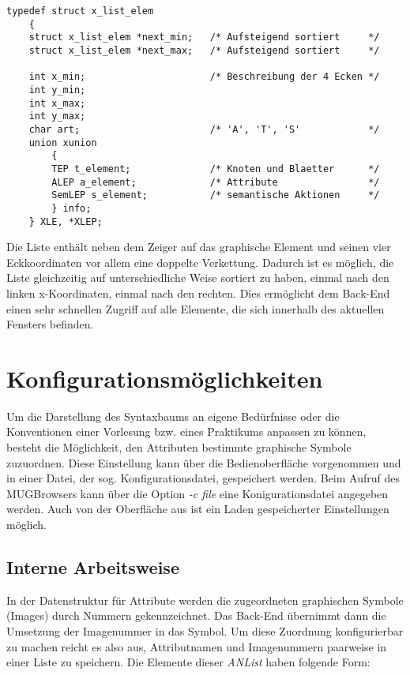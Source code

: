 \begin{small}
\begin{verbatim}
typedef struct x_list_elem
    {
    struct x_list_elem *next_min;   /* Aufsteigend sortiert     */
    struct x_list_elem *next_max;   /* Aufsteigend sortiert     */

    int x_min;                      /* Beschreibung der 4 Ecken */
    int y_min;
    int x_max;
    int y_max;
    char art;                       /* 'A', 'T', 'S'            */
    union xunion
        {
        TEP t_element;              /* Knoten und Blaetter      */
        ALEP a_element;             /* Attribute                */
        SemLEP s_element;           /* semantische Aktionen     */
        } info;
    } XLE, *XLEP;
\end{verbatim}
\end{small}

Die Liste enth\"alt neben dem Zeiger auf das graphische Element und seinen vier Eckkoordinaten vor allem eine doppelte Verkettung. Dadurch ist es
m\"oglich, die Liste gleichzeitig auf unterschiedliche Weise sortiert zu haben, einmal nach den linken x-Koordinaten, einmal nach den rechten. Dies
erm\"oglicht dem Back-End einen sehr schnellen Zugriff auf alle Elemente, die sich innerhalb des aktuellen Fensters befinden.

\section{Konfigurationsm\"oglichkeiten}

Um die Darstellung des Syntaxbaums an eigene Bed\"urfnisse oder die Konventionen einer Vorlesung bzw. eines Praktikums anpassen zu k\"onnen, besteht die
M\"oglichkeit, den Attributen bestimmte graphische Symbole zuzuordnen. Diese Einstellung kann \"uber die Bedienoberfl\"ache vorgenommen und in einer Datei,
der sog. Konfigurationsdatei, gespeichert werden. Beim Aufruf des MUGBrowsers kann \"uber die Option {\it-c file} eine Konigurationsdatei angegeben
werden. Auch von der Oberfl\"ache aus ist ein Laden gespeicherter Einstellungen m\"oglich.

\subsection{Interne Arbeitsweise}

In der Datenstruktur f\"ur Attribute werden die zugeordneten graphischen Symbole (Images) durch Nummern gekennzeichnet. Das Back-End \"ubernimmt dann die
Umsetzung der Imagenummer in das Symbol. Um diese Zuordnung konfigurierbar zu machen reicht es also aus, Attributnamen und Imagenummern paarweise in
einer Liste zu speichern. Die Elemente dieser {\it ANList} haben folgende Form:


